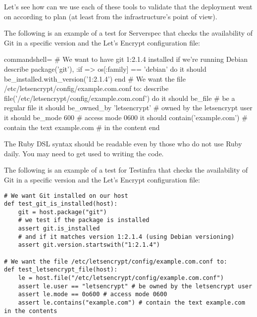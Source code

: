 Let's see how can we use each of these tools to validate that the deployment went on according to plan (at least from the infrastructure's point of view).


The following is an example of a test for Serverspec that checks the availability of Git in a specific version and the Let's Encrypt configuration file:

\begin{tcblisting}{commandshell={}}
# We want to have git 1:2.1.4 installed if we're running Debian
describe package('git'), :if => os[:family] == 'debian' do
  it { should be_installed.with_version('1:2.1.4') }
end
# We want the file /etc/letsencrypt/config/example.com.conf to:
describe file('/etc/letsencrypt/config/example.com.conf') do
  it { should be_file } # be a regular file
  it { should be_owned_by 'letsencrypt' } # owned by the letsencrypt user
  it { should be_mode 600 } # access mode 0600
  it { should contain('example.com') } # contain the text example.com
                                     # in the content
end
\end{tcblisting}

The Ruby DSL syntax should be readable even by those who do not use Ruby daily. You may need to get used to writing the code.


The following is an example of a test for Testinfra that checks the availability of Git in a specific version and the Let's Encrypt configuration file:

\begin{lstlisting}[style=stylePython]
# We want Git installed on our host
def test_git_is_installed(host):
	git = host.package("git")
	# we test if the package is installed
	assert git.is_installed
	# and if it matches version 1:2.1.4 (using Debian versioning)
	assert git.version.startswith("1:2.1.4")

# We want the file /etc/letsencrypt/config/example.com.conf to:
def test_letsencrypt_file(host):
	le = host.file("/etc/letsencrypt/config/example.com.conf")
	assert le.user == "letsencrypt" # be owned by the letsencrypt user
	assert le.mode == 0o600 # access mode 0600
	assert le.contains("example.com") # contain the text example.com in the contents
\end{lstlisting}

